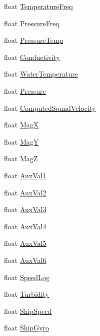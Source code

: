 \begin{DoxyCompactItemize}
\item 
float \hyperlink{structXtfPingHeader_a474ada8be75ec65928f154e7cc55faf2}{Temperature\+Freq}
\item 
float \hyperlink{structXtfPingHeader_a0e7f321d1c8f5020bb5932ce0eb00a44}{Pressure\+Freq}
\item 
float \hyperlink{structXtfPingHeader_aff7f3cea88f9e025ac02f74d55f19a0e}{Pressure\+Temp}
\item 
float \hyperlink{structXtfPingHeader_afe76e708e756c0d0332b8cca8634fa07}{Conductivity}
\item 
float \hyperlink{structXtfPingHeader_a995d67006342ba9fcf7f8dda3bf9ebaa}{Water\+Temperature}
\item 
float \hyperlink{structXtfPingHeader_a8a4d7151530b03a30c933898eff394fa}{Pressure}
\item 
float \hyperlink{structXtfPingHeader_a73b3838aec39b4a81fb9108534c626a6}{Computed\+Sound\+Velocity}
\item 
float \hyperlink{structXtfPingHeader_a04ee3c6b70d1500696574c067b095835}{MagX}
\item 
float \hyperlink{structXtfPingHeader_a54c4d16e15bc7c6b849474aa8fe17ea7}{MagY}
\item 
float \hyperlink{structXtfPingHeader_a32157ba735745ecc7db8d07f0e4a3f1a}{MagZ}
\item 
float \hyperlink{structXtfPingHeader_a86b13c0947d7c8e847c4cbabd19d66d0}{Aux\+Val1}
\item 
float \hyperlink{structXtfPingHeader_a4780de3bd4667ed9c3a9ea94523f0fae}{Aux\+Val2}
\item 
float \hyperlink{structXtfPingHeader_ac9d0ef6484b8f7eb4afa728ed168b41a}{Aux\+Val3}
\item 
float \hyperlink{structXtfPingHeader_ad64af804c96db0af3cc2648b6d8a4573}{Aux\+Val4}
\item 
float \hyperlink{structXtfPingHeader_ab4b11a1d4eae6b4d935b3d54855f1195}{Aux\+Val5}
\item 
float \hyperlink{structXtfPingHeader_a81c53a2d0484e494d9b891352334afce}{Aux\+Val6}
\item 
float \hyperlink{structXtfPingHeader_afaad7bea39b9b67d331b199243f1b23c}{Speed\+Log}
\item 
float \hyperlink{structXtfPingHeader_a8d889b3bd1af85962f4b0e3164fc715a}{Turbidity}
\item 
float \hyperlink{structXtfPingHeader_aab430dc0ebca788807b2dbdfdcd9d29f}{Ship\+Speed}
\item 
float \hyperlink{structXtfPingHeader_a2c7ec394192377c85013bf0519cd0e35}{Ship\+Gyro}

\end{DoxyCompactItemize}
